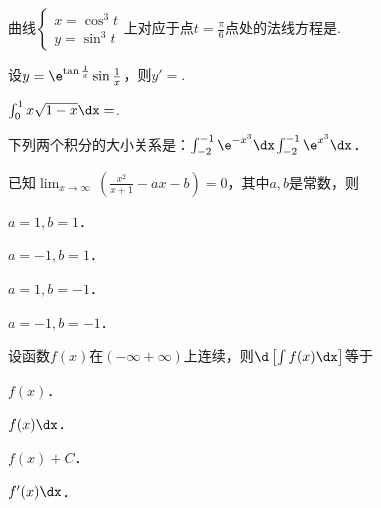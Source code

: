 \documentclass[plain,noanswer,medmath]{../../template/jnuexam}
\begin{document}






\begin{problem}
曲线$\begin{cases}
  x= \cos^3 t \\
  y= \sin^3 t
\end{cases}$上对应于点$t=\frac{\pi}{6}$点处的法线方程是\fillin{}.
\end{problem}


\begin{problem}
设$y=\e^{\tan\frac{1}{x}}\sin\frac{1}{x}$，则$y'=$\fillin{}.
\end{problem}


\begin{problem}
$\int_0^1x\sqrt{1-x}\dx=$\fillin{}.
\end{problem}


\begin{problem}
下列两个积分的大小关系是：$\int_{-2}^{-1}\e^{-x^3}\dx$\fillin{}$\int_{-2}^{-1}\e^{x^3}\dx$．
\end{problem}






\begin{problem}
已知$\lim_{x\to \infty}\,\left(\frac{x^2}{x+1}-ax-b \right)=0$，其中$a,b$是常数，则\pickout{}
\begin{abcd}
\item $a=1,b=1$．
\item $a=-1,b=1$．
\item $a=1,b=-1$．
\item $a=-1,b=-1$．
\end{abcd}
\end{problem}


\begin{problem}
设函数$f(x)$在$(-\infty +\infty)$上连续，则$\d\left[\int f(x)\dx \right]$等于\pickout{}
\begin{abcd}
\item $f(x)$．
\item $f(x)\dx$．
\item $f(x)+C$．
\item $f'(x)\dx$．
\end{abcd}
\end{problem}
\end{document}

